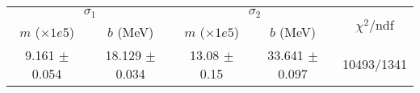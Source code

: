 \begin{tabular}{cc|cc||c}
\multicolumn{2}{c|}{$\sigma_1$} & \multicolumn{2}{|c}{$\sigma_2$} & \multirow{2}{*}{$\chi^2/$ndf} \\
$m$ ($\times1e5$) & $b$ (MeV) & $m$ ($\times1e5$) & $b$ (MeV) & \\
\hline
9.161 $\pm$ 0.054 & 18.129 $\pm$ 0.034 & 13.08 $\pm$ 0.15 & 33.641 $\pm$ 0.097 & 10493/1341\\
\end{tabular}
